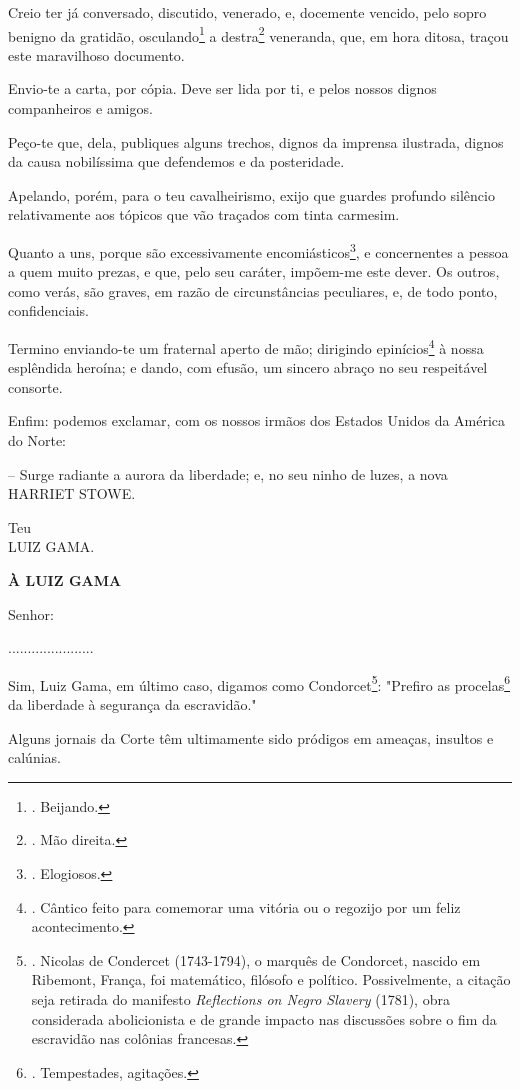Creio ter já conversado, discutido, venerado, e, docemente vencido, pelo
sopro benigno da gratidão, osculando\footnote{. Beijando.} a
destra\footnote{. Mão direita.} veneranda, que, em hora ditosa, traçou
este maravilhoso documento.

Envio-te a carta, por cópia. Deve ser lida por ti, e pelos nossos dignos
companheiros e amigos.

Peço-te que, dela, publiques alguns trechos, dignos da imprensa
ilustrada, dignos da causa nobilíssima que defendemos e da posteridade.

Apelando, porém, para o teu cavalheirismo, exijo que guardes profundo
silêncio relativamente aos tópicos que vão traçados com tinta carmesim.

Quanto a uns, porque são excessivamente encomiásticos\footnote{.
  Elogiosos.}, e concernentes a pessoa a quem muito prezas, e que, pelo
seu caráter, impõem-me este dever. Os outros, como verás, são graves, em
razão de circunstâncias peculiares, e, de todo ponto, confidenciais.

Termino enviando-te um fraternal aperto de mão; dirigindo
epinícios\footnote{. Cântico feito para comemorar uma vitória ou o
  regozijo por um feliz acontecimento.} à nossa esplêndida heroína; e
dando, com efusão, um sincero abraço no seu respeitável consorte.

Enfim: podemos exclamar, com os nossos irmãos dos Estados Unidos da
América do Norte:

-- Surge radiante a aurora da liberdade; e, no seu ninho de luzes, a
nova HARRIET STOWE.

Teu\\
LUIZ GAMA.

\textbf{À LUIZ GAMA}

Senhor:

......................

Sim, Luiz Gama, em último caso, digamos como Condorcet\footnote{.
  Nicolas de Condercet (1743-1794), o marquês de Condorcet, nascido em
  Ribemont, França, foi matemático, filósofo e político. Possivelmente,
  a citação seja retirada do manifesto \emph{Reflections on Negro
  Slavery} (1781), obra considerada abolicionista e de grande impacto
  nas discussões sobre o fim da escravidão nas colônias francesas.}:
"Prefiro as procelas\footnote{. Tempestades, agitações.} da liberdade à
segurança da escravidão."

Alguns jornais da Corte têm ultimamente sido pródigos em ameaças,
insultos e calúnias.

